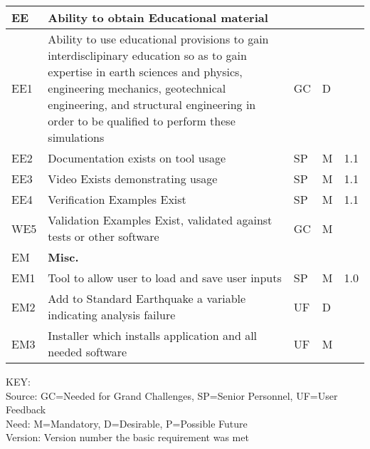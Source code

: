 \begin{longtable}{| p{} | p{} | p{} | p{} |  p{} |}


    EE & \textbf{Ability to obtain Educational material} &  &  & \\ \hline
    EE1 & Ability to use educational provisions to gain interdisclipinary education so as to gain expertise in earth sciences and physics, engineering mechanics, geotechnical engineering, and structural engineering in order to be qualified to perform these simulations & GC & D & \\ \hline
    EE2 & Documentation exists on tool usage & SP & M & 1.1  \\ \hline
    EE3 & Video Exists demonstrating usage & SP & M & 1.1  \\ \hline
    EE4 & Verification Examples Exist & SP & M & 1.1  \\ \hhline{=====}
    WE5 & Validation Examples Exist, validated against tests or other software & GC & M &  \\\hhline{=====}
    EM & \textbf{Misc.} &  & & \\ \hline
    EM1 & Tool to allow user to load and save user inputs & SP & M & 1.0 \\ \hline
    EM2 & Add to Standard Earthquake a variable indicating analysis failure & UF & D &   \\ \hline
    EM3 & Installer which installs application and all needed software & UF & M &   \\ \hline
      
  \bottomrule 
               
\end{longtable}

\noindent
KEY:\\
Source: GC=Needed for Grand Challenges, SP=Senior Personnel, UF=User Feedback \\
Need: M=Mandatory, D=Desirable, P=Possible Future \\
Version: Version number the basic requirement was met 
